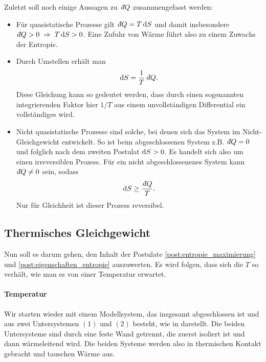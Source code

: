 Zuletzt soll noch einige Aussagen zu $\udiff Q$ zusammengefasst werden:
\begin{itemize}
    \item Für quasistatische Prozesse gilt $\udiff Q=T\diff S$ und damit insbesondere $\udiff Q>0\implication T\diff S>0$. Eine Zufuhr von Wärme führt also zu einem Zuwachs der Entropie. 
    \item Durch Umstellen erhält man 
    \begin{align*}
        \diff S = \frac{1}{T}\udiff Q.
    \end{align*}
    Diese Gleichung kann so gedeutet werden, dass durch einen sogenannten integrierenden Faktor \textendash{} hier $1/T$ \textendash{} aus einem unvollständigen Differential ein vollständiges wird. 
    \item Nicht quasistatische Prozesse sind solche, bei denen sich das System im Nicht-Gleichgewicht entwickelt. So ist beim abgeschlossenen System z.B. $\udiff Q=0$ und folglich nach dem zweiten Postulat $\mathop{}\!\mathrm{d} S >0$. Es handelt sich also um einen irreversiblen Prozess. Für ein nicht abgeschlossenenes System kann $\udiff Q\neq 0$ sein, sodass 
    \begin{align*}
        \diff S\geq \frac{\udiff Q}{T}. 
    \end{align*}
    Nur für Gleichheit ist dieser Prozess reversibel. 
\end{itemize}










\subsection{Thermisches Gleichgewicht}

Nun soll es darum gehen, den Inhalt der Postulate \ref{post:entropie_maximierung} und \ref{post:eigenschaften_entropie} auszuwerten. 
Es wird folgen, dass sich die $T$ so verhält, wie man es von einer Temperatur erwartet. 

\paragraph*{Temperatur}

Wir starten wieder mit einem Modellsystem, das insgesamt abgeschlossen ist und aus zwei Untersystemen $(1)$ und $(2)$ besteht, wie in  darstellt. 
Die beiden Untersysteme sind durch eine feste Wand getrennt, die zuerst isoliert ist und dann wärmeleitend wird. Die beiden Systeme werden also in thermischen Kontakt gebracht und tauschen Wärme aus. 

